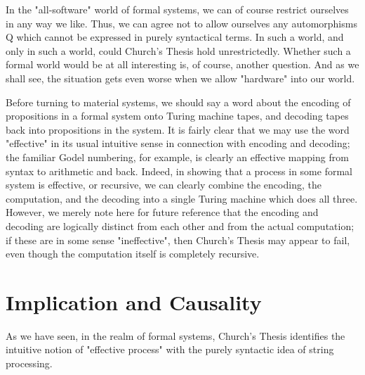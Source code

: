 \documentclass[a4paper,12pt]{article}
\begin{document}
In the "all-software" world of formal systems, we can of course restrict ourselves in any way we like.
Thus, we can agree not to allow ourselves any automorphisms Q which cannot be expressed in purely syntactical
terms. In such a world, and only in such a world, could Church's Thesis hold unrestrictedly.
Whether such a formal world would be at all interesting is, of course, another question.
And as we shall see, the situation gets even worse when we allow "hardware" into our world.

Before turning to material systems, we should say a word about the encoding of propositions
in a formal system onto Turing machine tapes, and decoding tapes back into propositions in the system.
It is fairly clear that we may use the word "effective" in its usual intuitive sense in connection
with encoding and decoding; the familiar Godel numbering, for example, is
clearly an effective mapping from syntax to arithmetic and back. Indeed,
in showing that a process in some formal system is effective, or recursive,
we can clearly combine the encoding, the computation, and the decoding
into a single Turing machine which does all three. However, we merely note
here for future reference that the encoding and decoding are logically distinct from each other
and from the actual computation; if these are in some sense "ineffective", then Church's Thesis
may appear to fail, even though the computation itself is completely recursive.

\section{Implication and Causality}

As we have seen, in the realm of formal systems, Church's Thesis identifies the intuitive notion of "effective process" with the purely syntactic idea of string processing.
\end{document}
